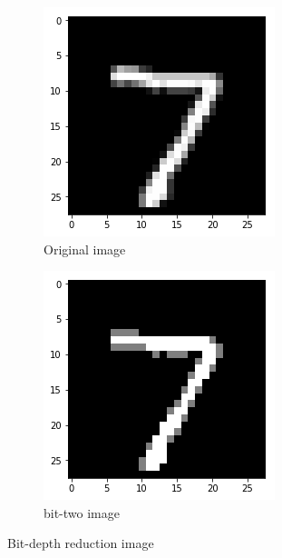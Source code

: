 \begin{figure}[h!]
	\centering
	\begin{subfigure}{.35\textwidth}
		\includegraphics[width=\textwidth]{original7.png}
		\caption{Original image}
		\label{fig: bit-depth reduction 1}
	\end{subfigure}
	\begin{subfigure}{.35\textwidth}
		\includegraphics[width=\textwidth]{bit1-7.png}
		\caption{bit-two image}
		\label{fig: bit-depth reduction 8}
	\end{subfigure}
	\caption{Bit-depth reduction image}
\end{figure}

